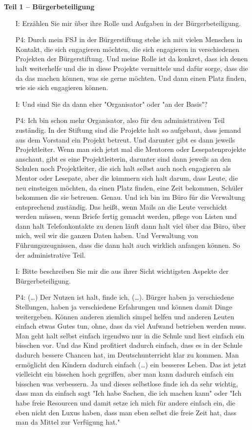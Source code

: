 \textbf{Teil 1 -- B{\"u}rgerbeteiligung}
\begin{itemize}
    \item[I:] Erz{\"a}hlen Sie mir {\"u}ber ihre Rolle und Aufgaben in der B{\"u}rgerbeteiligung.
    \item[P4:] Durch mein FSJ in der B{\"u}rgerstiftung stehe ich mit vielen Menschen in Kontakt, die sich engagieren m{\"o}chten, die sich engagieren in verschiedenen Projekten der B{\"u}rgerstiftung. Und meine Rolle ist da konkret, dass ich denen halt weiterhelfe und die in diese Projekte vermittele und daf{\"u}r sorge, dass die da das machen k{\"o}nnen, was sie gerne m{\"o}chten. Und dann einen Platz finden, wie sie sich engagieren k{\"o}nnen.
    \item[I:] Und sind Sie da dann eher "Organisator" oder "an der Basis"?
    \item[P4:] Ich bin schon mehr Organisator, also f{\"u}r den administrativen Teil zust{\"a}ndig. In der Stiftung sind die Projekte halt so aufgebaut, dass jemand aus dem Vorstand ein Projekt betreut. Und darunter gibt es dann jeweils Projektleiter. Wenn man sich jetzt mal die Mentoren oder Lesepatenprojekte anschaut, gibt es eine Projektleiterin, darunter sind dann jeweils an den Schulen noch Projektleiter, die sich halt selbst auch noch engagieren als Mentor oder Lesepate, aber die k{\"u}mmern sich halt darum, dass Leute, die neu einsteigen m{\"o}chten, da einen Platz finden, eine Zeit bekommen, Sch{\"u}ler bekommen die sie betreuen. Genau. Und ich bin im B{\"u}ro f{\"u}r die Verwaltung entsprechend zust{\"a}ndig. Das hei{\ss}t, wenn Mails an die Leute verschickt werden m{\"u}ssen, wenn Briefe fertig gemacht werden, pflege von Listen und dann halt Telefonkontakte zu denen l{\"a}uft dann halt viel {\"u}ber das B{\"u}ro, {\"u}ber mich, weil wir die ganzen Daten haben. Und Verwaltung von F{\"u}hrungszeugnissen, dass die dann halt auch wirklich anfangen k{\"o}nnen. So der administrative Teil.
    \item[I:] Bitte beschreiben Sie mir die aus ihrer Sicht wichtigsten Aspekte der B{\"u}rgerbeteiligung.
    \item[P4:] (\dots) Der Nutzen ist halt, finde ich, (\dots). B{\"u}rger haben ja verschiedene Stellungen, haben ja verschiedene Erfahrungen und k{\"o}nnen damit Dinge weitergeben. K{\"o}nnen anderen ziemlich simpel helfen und anderen Leuten einfach etwas Gutes tun, ohne, dass da viel Aufwand betrieben werden muss. Man geht halt selbst einfach irgendwo nur in die Schule und liest einfach ein bisschen vor. Und das Kind profitiert dadurch einfach, dass es in der Schule dadurch bessere Chancen hat, im Deutschunterricht klar zu kommen. Man erm{\"o}glicht den Kindern dadurch einfach (\dots) ein besseres Leben. Das ist jetzt vielleicht ein bisschen hoch gegriffen, aber man kann dadurch einfach ein bisschen was verbessern. Ja und dieses selbstlose finde ich da sehr wichtig, dass man da einfach sagt "Ich habe Sachen, die ich machen kann" oder "Ich habe freie Resourcen und damit setze ich mich f{\"u}r andere einfach ein, die eben nicht den Luxus haben, dass man eben selbst die freie Zeit hat, dass man da Mittel zur Verf{\"u}gung hat."

\end{itemize}
